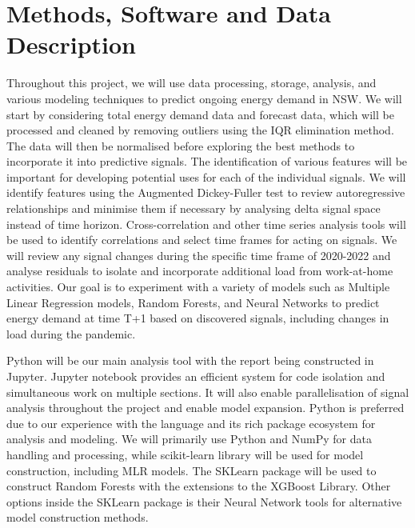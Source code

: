 \documentclass[mstat,12pt]{unswthesis}
\begin{document}
\hypertarget{methods-software-and-data-description}{%
\section{Methods, Software and Data
Description}\label{methods-software-and-data-description}}

Throughout this project, we will use data processing, storage, analysis, and various modeling techniques to predict ongoing energy demand in NSW. We will start by considering total energy demand data and forecast data, which will be processed and cleaned by removing outliers using the IQR elimination method. The data will then be normalised before exploring the best methods to incorporate it into predictive signals. The identification of various features will be important for developing potential uses for each of the individual signals. We will identify features using the Augmented Dickey-Fuller test to review autoregressive relationships and minimise them if necessary by analysing delta signal space instead of time horizon. Cross-correlation and other time series analysis tools will be used to identify correlations and select time frames for acting on signals. We will review any signal changes during the specific time frame of 2020-2022 and analyse residuals to isolate and incorporate additional load from work-at-home activities. Our goal is to experiment with a variety of models such as Multiple Linear Regression models, Random Forests, and Neural Networks to predict energy demand at time T+1 based on discovered signals, including changes in load during the pandemic.

\bigskip

Python will be our main analysis tool with the report being constructed in Jupyter. Jupyter notebook provides an efficient system for code isolation and simultaneous work on multiple sections. It will also enable parallelisation of signal analysis throughout the project and enable model expansion. Python is preferred due to our experience with the language and its rich package ecosystem for analysis and modeling. We will primarily use Python and NumPy for data handling and processing, while scikit-learn library will be used for model construction, including MLR models. The SKLearn package will be used to construct Random Forests with the extensions to the XGBoost Library. Other options inside the SKLearn package is their Neural Network tools for alternative model construction methods.

\bigskip
\end{document}
